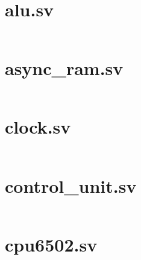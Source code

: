 \documentclass[
	12pt,				  %
	openright,		%
	a4paper,			%
	english,			%
	french,				%
	spanish,			%
	brazil,				%
]{abntex2}
\begin{document}


\postextual





\begin{apendicesenv}

	\partapendices

	\chapter{alu.sv}\label{attach:alu}
	\inputminted[breaklines]{systemverilog}{../quartus/synthesis/alu.sv}

	\chapter{async{\_}ram.sv}\label{attach:async_ram}
	\inputminted[breaklines]{systemverilog}{../quartus/synthesis/async_ram.sv}

	\chapter{clock.sv}\label{attach:clock}
	\inputminted[breaklines]{systemverilog}{../quartus/synthesis/clock.sv}

	\chapter{control{\_}unit.sv}\label{attach:control_unit}
	\inputminted[breaklines]{systemverilog}{../quartus/synthesis/control_unit.sv}

	\chapter{cpu6502.sv}\label{attach:cpu6502}
	\inputminted[breaklines]{systemverilog}{../quartus/synthesis/cpu6502.sv}


\end{apendicesenv}
\end{document}
